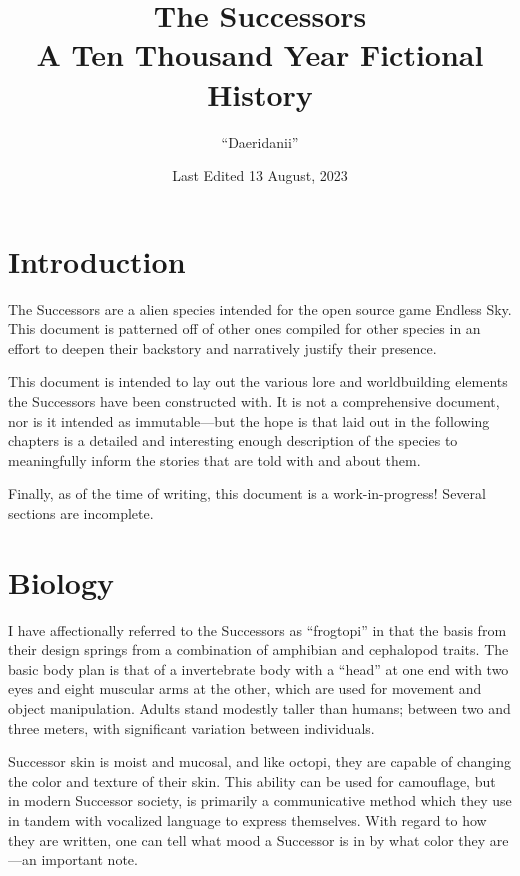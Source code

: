 \documentclass[11pt]{report}
\title{%
    The Successors \\ 
    \smallskip
    \large A Ten Thousand Year Fictional History}
\author{``Daeridanii''}
\date{Last Edited 13 August, 2023}
\begin{document}
    \maketitle
    \tableofcontents
    \newpage
    \section{Introduction}
    The Successors are a alien species intended for the open source game Endless Sky. This document is patterned off of other ones compiled for other species in an effort to deepen their backstory and narratively justify their presence.
    
    This document is intended to lay out the various lore and worldbuilding elements the Successors have been constructed with. It is not a comprehensive document, nor is it intended as immutable---but the hope is that laid out in the following chapters is a detailed and interesting enough description of the species to meaningfully inform the stories that are told with and about them.

    Finally, as of the time of writing, this document is a work-in-progress! Several sections are incomplete.

    \section{Biology}
    I have affectionally referred to the Successors as ``frogtopi'' in that the basis from their design springs from a combination of amphibian and cephalopod traits. The basic body plan is that of a invertebrate body with a ``head'' at one end with two eyes and eight muscular arms at the other, which are used for movement and object manipulation. Adults stand modestly taller than humans; between two and three meters, with significant variation between individuals. 

    Successor skin is moist and mucosal, and like octopi, they are capable of changing the color and texture of their skin. This ability can be used for camouflage, but in modern Successor society, is primarily a communicative method which they use in tandem with vocalized language to express themselves. With regard to how they are written, one can tell what mood a Successor is in by what color they are---an important note.
    
\end{document}

